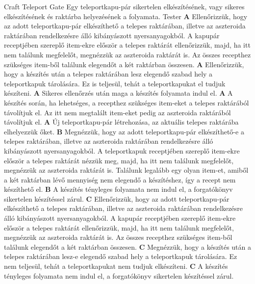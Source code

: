 \documentclass[../../projlab]{subfiles}
\begin{document}
\begin{use-case}
    {Craft Teleport Gate}
    {Egy teleportkapu-pár sikertelen elkészítésének, vagy sikeres elkészítésének és raktárba helyezésének a folyamata.  }
    {Tester} 
    \textbf{A} Ellenőrizzük, hogy az adott teleportkapu-pár elkészíthető a telepes raktárában, illetve az aszteroida raktárában rendelkezésre álló kibányászott nyersanyagokból. A kapupár receptjében szereplő item-ekre először a telepes raktárát ellenőrizzük, majd, ha itt nem találunk megfelelőt, megnézzük az aszteroida raktárát is.  Az összes recepthez szükséges item-ből találunk elegendőt a két raktárban összesen.   \newline
    \textbf{A} Ellenőrizzük, hogy a készítés után a telepes raktárában lesz elegendő szabad hely a teleportkapuk tárolására. Ez is teljesül, tehát a teleportkapukat el tudjuk készíteni. \newline
    \textbf{A} Sikeres ellenőrzés után maga a készítés folyamata indul el.  \newline
    \textbf{A} A készítés során, ha lehetséges, a recepthez szükséges item-eket a telepes raktárából távolítjuk el. Az itt nem megtalált item-eket pedig az aszteroida raktárából távolítjuk el.  \newline
    \textbf{A} Új teleportkapu-pár létrehozása, az aktuális telepes raktárába elhelyezzük őket. \newline
    \textbf{B} Megnézzük, hogy az adott teleportkapu-pár elkészíthető-e a telepes raktárában, illetve az aszteroida raktárában rendelkezésre álló kibányászott nyersanyagokból. A teleportkapuk receptjében szereplő item-ekre először a telepes raktárát nézzük meg, majd, ha itt nem találunk megfelelőt, megnézzük az aszteroida raktárát is. Találunk legalább egy olyan item-et, amiből a két raktárban lévő mennyiség nem elegendő a készítéshez, így a recept nem készíthető el.  \newline
    \textbf{B} A készítés tényleges folyamata nem indul el, a forgatókönyv sikertelen készítéssel zárul.  \newline
    \textbf{C} Ellenőrizzük, hogy az adott teleportkapu-pár elkészíthető a telepes raktárában, illetve az aszteroida raktárában rendelkezésre álló kibányászott nyersanyagokból. A kapupár receptjében szereplő item-ekre először a telepes raktárát ellenőrizzük, majd, ha itt nem találunk megfelelőt, megnézzük az aszteroida raktárát is.  Az összes recepthez szükséges item-ből találunk elegendőt a két raktárban összesen.  \newline
    \textbf{C} Megnézzük, hogy a készítés után a telepes raktárában lesz-e elegendő szabad hely a teleportkapuk tárolására. Ez nem teljesül, tehát a teleportkapukat nem tudjuk elkészíteni.  \newline
    \textbf{C} A készítés tényleges folyamata nem indul el, a forgatókönyv sikertelen készítéssel zárul.  \newline
\end{use-case}
\end{document}
